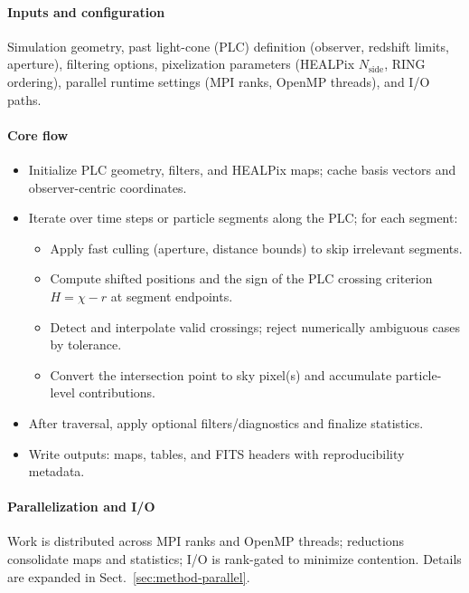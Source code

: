 \documentclass{aa}
\begin{document}
\paragraph{Inputs and configuration}
Simulation geometry, past light-cone (PLC) definition (observer, redshift limits, aperture), filtering options, pixelization parameters (HEALPix $N_\mathrm{side}$, RING ordering), parallel runtime settings (MPI ranks, OpenMP threads), and I/O paths.

\paragraph{Core flow}
\begin{itemize}
   \item Initialize PLC geometry, filters, and HEALPix maps; cache basis vectors and observer-centric coordinates.
   \item Iterate over time steps or particle segments along the PLC; for each segment:
   \begin{itemize}
      \item Apply fast culling (aperture, distance bounds) to skip irrelevant segments.
      \item Compute shifted positions and the sign of the PLC crossing criterion $H = \chi - r$ at segment endpoints.
      \item Detect and interpolate valid crossings; reject numerically ambiguous cases by tolerance.
      \item Convert the intersection point to sky pixel(s) and accumulate particle-level contributions.
   \end{itemize}
   \item After traversal, apply optional filters/diagnostics and finalize statistics.
   \item Write outputs: maps, tables, and FITS headers with reproducibility metadata.
\end{itemize}

\paragraph{Parallelization and I/O}
Work is distributed across MPI ranks and OpenMP threads; reductions consolidate maps and statistics; I/O is rank-gated to minimize contention. Details are expanded in Sect.~\ref{sec:method-parallel}.
\end{document}
